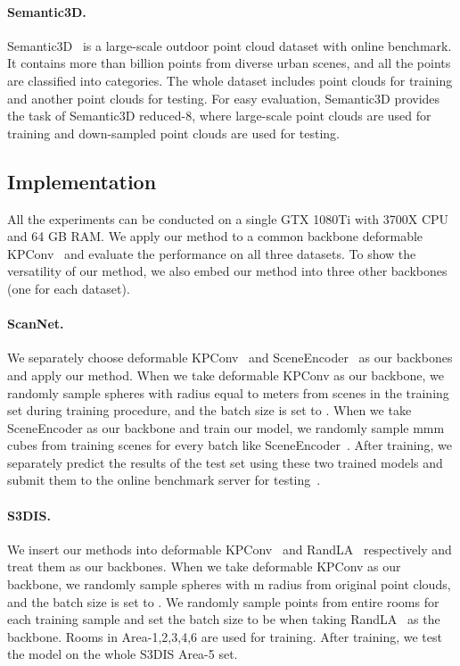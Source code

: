 \documentclass[final]{cvpr}
\begin{document}
\paragraph{Semantic3D.} Semantic3D~\cite{hackel2017semantic3d} is a large-scale outdoor point cloud dataset with online benchmark. It contains more than  billion points from diverse urban scenes, and all the points are classified into  categories. The whole dataset includes  point clouds for training and another  point clouds for testing. For easy evaluation, Semantic3D provides the task of Semantic3D reduced-8, where  large-scale point clouds are used for training and  down-sampled point clouds are used for testing. 

\subsection{Implementation}
\label{subsec:implementation}
All the experiments can be conducted on a single GTX 1080Ti with 3700X CPU and 64 GB RAM. We apply our method to a common backbone deformable KPConv~\cite{thomas2019kpconv} and evaluate the performance on all three datasets. To show the versatility of our method, we also embed our method into three other backbones (one for each dataset).
\paragraph{ScanNet.}
We separately choose deformable KPConv~\cite{thomas2019kpconv} and SceneEncoder~\cite{xu2020sceneencoder} as our backbones and apply our method.
When we take deformable KPConv as our backbone, we randomly sample spheres with radius equal to  meters from scenes in the training set during training procedure, and the batch size is set to .
When we take SceneEncoder as our backbone and train our model, we randomly sample  mmm cubes from training scenes for every batch like SceneEncoder~\cite{xu2020sceneencoder}. 
After training, we separately predict the results of the test set using these two trained models and submit them to the online benchmark server for testing~\cite{dai2017scannet}. 

\paragraph{S3DIS.}
We insert our methods into deformable KPConv~\cite{thomas2019kpconv} and RandLA~\cite{hu2020randla} respectively and treat them as our backbones. When we take deformable KPConv as our backbone, we randomly sample spheres with m radius from original point clouds, and the batch size is set to . We randomly sample  points from entire rooms for each training sample and set the batch size to be  when taking RandLA~\cite{hu2020randla} as the backbone. Rooms in Area-1,2,3,4,6 are used for training. After training, we test the model on the whole S3DIS Area-5 set.
\end{document}
